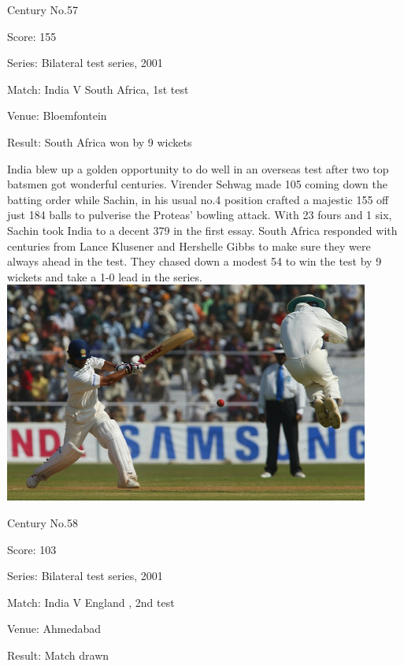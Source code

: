 \documentclass[11pt, a4paper]{article}
\begin{document}
Century No.57 

Score: 155 

Series: Bilateral test series, 2001 

Match: India V South Africa, 1st test 

Venue: Bloemfontein 

Result: South Africa won by 9 wickets 

India blew up a golden opportunity to do well in an overseas test after two top batsmen got wonderful centuries. Virender Sehwag made 105 coming down the batting order while Sachin, in his usual no.4 position crafted a majestic 155 off just 184 balls to pulverise the Proteas' bowling attack. With 23 fours and 1 six, Sachin took India to a decent 379 in the first essay. South Africa responded with centuries from Lance Klusener and Hershelle Gibbs to make sure they were always ahead in the test. They chased down a modest 54 to win the test by 9 wickets and take a 1-0 lead in the series.
\newpage
\includegraphics[width=0.9\textwidth]{pics/58.jpg}

Century No.58 

Score: 103 

Series: Bilateral test series, 2001 

Match: India V England , 2nd test 

Venue: Ahmedabad 

Result: Match drawn 
\end{document}
